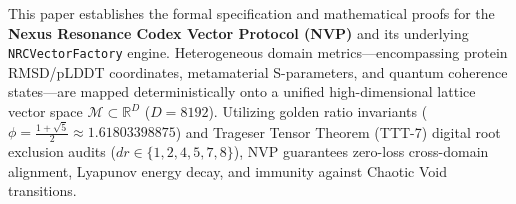 \begin{abstractbox}
This paper establishes the formal specification and mathematical proofs for the \textbf{Nexus Resonance Codex Vector Protocol (NVP)} and its underlying \texttt{NRCVectorFactory} engine. Heterogeneous domain metrics—encompassing protein RMSD/pLDDT coordinates, metamaterial S-parameters, and quantum coherence states—are mapped deterministically onto a unified high-dimensional lattice vector space $\mathcal{M} \subset \mathbb{R}^D$ ($D = 8192$). Utilizing golden ratio invariants ($\phi = \frac{1+\sqrt{5}}{2} \approx 1.61803398875$) and Trageser Tensor Theorem (TTT-7) digital root exclusion audits ($dr \in \{1, 2, 4, 5, 7, 8\}$), NVP guarantees zero-loss cross-domain alignment, Lyapunov energy decay, and immunity against Chaotic Void transitions.
\end{abstractbox}
